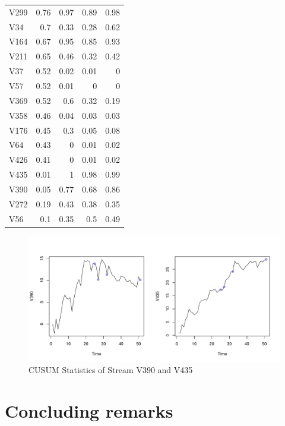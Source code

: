 \documentclass[]{interact}
\theoremstyle{plain}%
\theoremstyle{definition}
\theoremstyle{remark}
\begin{document}
\begin{table}[htbp]
\begin{tabular}{lrrrr}
    V299 & 0.76 & 0.97 & 0.89 & 0.98 \\
    V34 & 0.7 & 0.33 & 0.28 & 0.62 \\
    V164 & 0.67 & 0.95 & 0.85 & 0.93 \\
    V211 & 0.65 & 0.46 & 0.32 & 0.42 \\
    V37 & 0.52 & 0.02 & 0.01 & 0 \\
    V57 & 0.52 & 0.01 & 0 & 0 \\
    V369 & 0.52 & 0.6 & 0.32 & 0.19 \\
    V358 & 0.46 & 0.04 & 0.03 & 0.03 \\
    V176 & 0.45 & 0.3 & 0.05 & 0.08 \\
    V64 & 0.43 & 0 & 0.01 & 0.02 \\
    V426 & 0.41 & 0 & 0.01 & 0.02 \\
    V435 & 0.01 & 1 & 0.98 & 0.99 \\
    V390 & 0.05 & 0.77 & 0.68 & 0.86 \\
    V272 & 0.19 & 0.43 & 0.38 & 0.35 \\
    V56 & 0.1 & 0.35 & 0.5 & 0.49 \\
      \bottomrule
    \end{tabular}%
  \label{tab:addlabel}%
\end{table}%


\begin{figure}[H]
\centering
\includegraphics[scale=0.6]{390435}
\caption{CUSUM Statistics of Stream V390 and V435}
\end{figure}


\section{Concluding remarks}
\end{document}
